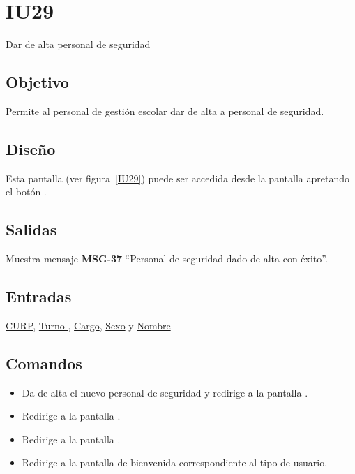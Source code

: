 
\section{IU29} {Dar de alta personal de seguridad}
\subsection{Objetivo}
    Permite al personal de gestión escolar dar de alta a personal de seguridad.
\subsection{Diseño}
    Esta pantalla  (ver figura~\ref{IU29}) puede ser accedida desde la pantalla  apretando el botón .

\subsection{Salidas}
Muestra mensaje {\bf MSG-37} ``Personal de seguridad dado de alta con éxito''.
\subsection{Entradas}
\hyperlink{Personal-de-seguridad.CURP }{CURP}, \hyperlink{personal-de-seguridad.Turno }{Turno }, \hyperlink{ Personal-de-seguridad.Cargo }{Cargo}, \hyperlink{ Personal-de-seguridad.Sexo}{Sexo} y \hyperlink{ Personal-de-seguridad.Nombre}{Nombre} 
\subsection{Comandos}
\begin{itemize}
    \item {} Da de alta el nuevo personal de seguridad y redirige a la pantalla .
    \item {} Redirige a la pantalla .
    \item {} Redirige a la pantalla .
    \item {} Redirige a la pantalla de bienvenida correspondiente al tipo de usuario.
    
\end{itemize}

